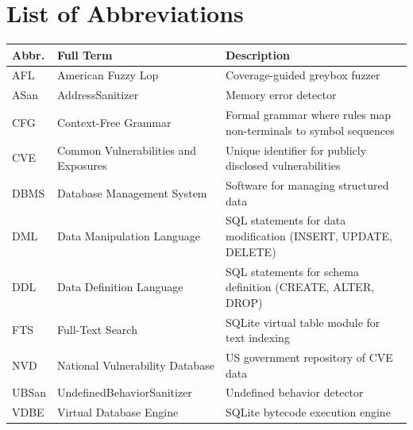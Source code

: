 \chapter*{List of Abbreviations}

\begin{tabular}{l >{\raggedright\arraybackslash}p{4.5cm} >{\raggedright\arraybackslash}p{7.0cm}}
\toprule
\textbf{Abbr.} & \textbf{Full Term} & \textbf{Description} \\
\midrule
AFL & American Fuzzy Lop & Coverage-guided greybox fuzzer \\
ASan & AddressSanitizer & Memory error detector \\
CFG & Context-Free Grammar & Formal grammar where rules map non-terminals to symbol sequences \\
CVE & Common Vulnerabilities and Exposures & Unique identifier for publicly disclosed vulnerabilities \\
DBMS & Database Management System & Software for managing structured data \\
DML & Data Manipulation Language & SQL statements for data modification (INSERT, UPDATE, DELETE) \\
DDL & Data Definition Language & SQL statements for schema definition (CREATE, ALTER, DROP) \\
FTS & Full-Text Search & SQLite virtual table module for text indexing \\
NVD & National Vulnerability Database & US government repository of CVE data \\
UBSan & Undefined\-Behavior\-Sanitizer & Undefined behavior detector \\
VDBE & Virtual Database Engine & SQLite bytecode execution engine \\
\bottomrule
\end{tabular}
